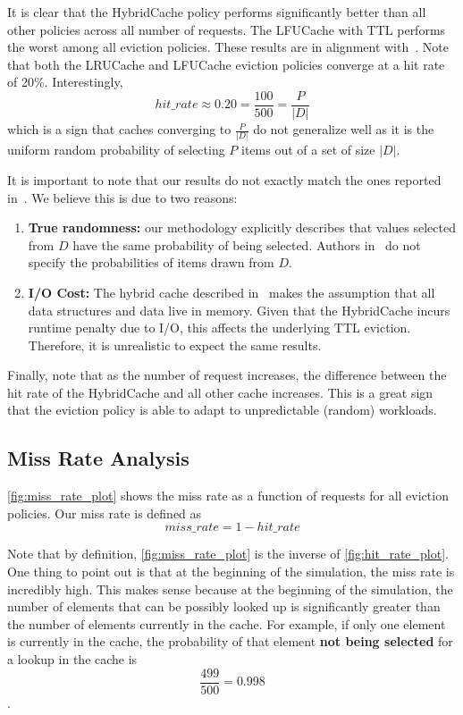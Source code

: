 It is clear that the HybridCache policy performs significantly
better than all other policies across all number of requests.
The LFUCache with TTL performs the worst
among all eviction policies. These results
are in alignment with~\cite{shah2023ImprovedCacheEviction}.
Note that both the LRUCache and LFUCache eviction
policies converge at a hit rate of 20\%.
Interestingly, \[hit\_rate \approx 0.20 = \frac{100}{500} = \frac{P}{|D|}\]
which is a sign that caches converging
to $\frac{P}{|D|}$ do not generalize well as it
is the uniform random probability of selecting $P$ items
out of a set of size $|D|$.

It is important to note that our results do not
exactly match
the ones reported in~\cite{shah2023ImprovedCacheEviction}.
We believe this is due to two reasons:

\begin{enumerate}
    \item \textbf{True randomness:} our methodology explicitly
    describes that values selected from $D$ have the same
    probability of being selected. Authors in~\cite{shah2023ImprovedCacheEviction}
    do not specify the probabilities of items drawn from $D$.
    \item \textbf{I/O Cost:} The hybrid cache
    described in~\cite{shah2023ImprovedCacheEviction}
    makes the assumption that all data structures
    and data live in memory. Given that the HybridCache
    incurs runtime penalty due to I/O, this affects
    the underlying TTL eviction. Therefore,
    it is unrealistic to expect the same results.
\end{enumerate}

Finally, note that as the number of request increases, the
difference between the hit rate of the HybridCache
and all other cache increases. This is a great sign
that the eviction policy is able to adapt to unpredictable
(random)
workloads.

\subsection{Miss Rate Analysis}

\autoref{fig:miss_rate_plot} shows the miss rate as a function
of requests for all eviction policies.
Our miss rate is defined as
\[miss\_rate = 1 - hit\_rate\]

Note that by definition, \autoref{fig:miss_rate_plot}
is the inverse of \autoref{fig:hit_rate_plot}. 
One thing to point out is that at the beginning
of the simulation, the miss rate is incredibly high.
This makes sense because at the beginning of the simulation,
the number of elements that can be possibly looked up
is significantly greater than the number of elements
currently in the cache. For example, if only
one element is currently in the cache,
the probability of that element \textbf{not being selected}
for a lookup in the cache is \[\frac{499}{500} = 0.998\].

